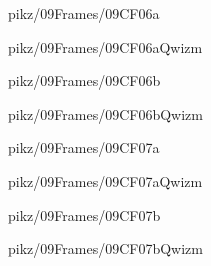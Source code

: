 \documentclass[9pt,xcolor={svgnames, x11names}]{beamer}
\begin{document}

\begin{frame}{pikz/09Frames/09CF06a}
  
\end{frame}


\begin{frame}{pikz/09Frames/09CF06aQwizm}
  
\end{frame}


\begin{frame}{pikz/09Frames/09CF06b}
  
\end{frame}


\begin{frame}{pikz/09Frames/09CF06bQwizm}
  
\end{frame}


\begin{frame}{pikz/09Frames/09CF07a}
  
\end{frame}


\begin{frame}{pikz/09Frames/09CF07aQwizm}
  
\end{frame}


\begin{frame}{pikz/09Frames/09CF07b}
  
\end{frame}


\begin{frame}{pikz/09Frames/09CF07bQwizm}
  
\end{frame}
\end{document}
